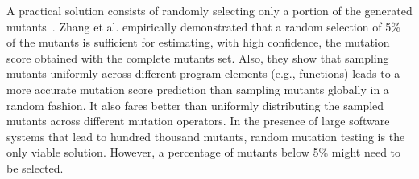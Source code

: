 A practical solution consists of  randomly selecting only a portion of the generated mutants~\cite{zhang2010operator,gopinath2015hard,zhang2013operator}. 
%
%
% 
Zhang et al. \cite{zhang2013operator} empirically demonstrated that a random selection of 5\% of the mutants is sufficient for 
estimating, with high confidence, the mutation score obtained with the complete mutants set.
Also,
they show that sampling mutants uniformly across different program elements (e.g., functions) %
leads to a more accurate mutation score prediction than sampling mutants globally in a random fashion. It also fares better than uniformly distributing the sampled mutants across different mutation operators. In the presence of large software systems that lead to hundred thousand mutants, random mutation testing is the only viable solution. However, a percentage of mutants below 5\% might need to be selected.

